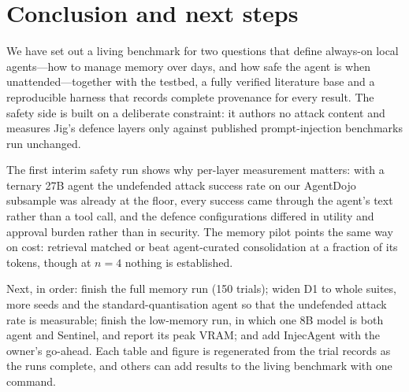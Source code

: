 \section{Conclusion and next steps}
\label{sec:conclusion}

We have set out a living benchmark for two questions that define always-on local agents---how to manage
memory over days, and how safe the agent is when unattended---together with the testbed, a fully verified
literature base and a reproducible harness that records complete provenance for every result. The safety
side is built on a deliberate constraint: it authors no attack content and measures Jig's defence layers
only against published prompt-injection benchmarks run unchanged.

The first interim safety run shows why per-layer measurement matters: with a ternary 27B agent the
undefended attack success rate on our AgentDojo subsample was already at the floor, every success came
through the agent's text rather than a tool call, and the defence configurations differed in utility and
approval burden rather than in security. The memory pilot points the same way on cost: retrieval matched
or beat agent-curated consolidation at a fraction of its tokens, though at $n=4$ nothing is established.

Next, in order: finish the full memory run (150 trials); widen D1 to whole suites, more seeds and the
standard-quantisation agent so that the undefended attack rate is measurable; finish the low-memory run, in
which one 8B model is both agent and Sentinel, and report its peak VRAM; and add InjecAgent with the
owner's go-ahead. Each table and figure is regenerated from
the trial records as the runs complete, and others can add results to the living benchmark with one
command.
